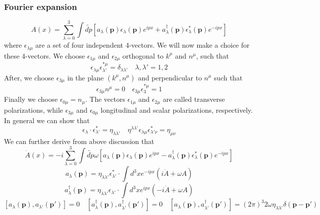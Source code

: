 \documentclass[cyan]{elegantnote}
\begin{document}
\subsubsection{Fourier expansion}
\[A(x) = \sum_{\lambda=0}^{3} \int \widetilde{dp} [a_{\lambda}(\bm{p}) \epsilon_{\lambda}(\bm{p})e^{ipx} + a^{\dagger}_{\lambda}(\bm{p}) \epsilon^*_{\lambda}(\bm{p})e^{-ipx}]\]
where $\epsilon_{\lambda \mu}$ are a set of four independent 4-vectors.  We will now make a choice for these 4-vectors. We choose $\epsilon_{1\mu}$ and $\epsilon_{2\mu}$ orthogonal to $k^{\mu}$ and $n^{\mu}$, such that
\[\epsilon_{\lambda \mu} \epsilon^{*\mu}_{\lambda'} = \delta_{\lambda \lambda'} \quad \lambda,\lambda' = 1,2\]
After, we choose $\epsilon_{3\mu}$ in the plane $(k^{\mu},n^{\mu})$ and perpendicular to $n^{\mu}$ such that
\[\epsilon_{3\mu} n^{\mu} = 0 \quad \epsilon_{3\mu} \epsilon^{*\mu}_{3} = 1\]
Finally we choose $\epsilon_{0\mu} = n_{\mu}$. The vectors $\epsilon_{1\mu}$ and $\epsilon_{2\mu}$ are called transverse polarizations, while $\epsilon_{3\mu}$ and $\epsilon_{0\mu}$ longitudinal and scalar polarizations, respectively.\\
In general we can show that
\[\epsilon_{\lambda} \cdot \epsilon^*_{\lambda'} = \eta_{\lambda \lambda'} \quad \eta^{\lambda \lambda'} \epsilon_{\lambda \mu} \epsilon^*_{\lambda' \nu} = \eta_{\mu \nu} \]
We can further derive from above discussion that
\[\dot{A}(x) = -i \sum_{\lambda=0}^{3} \int \widetilde{dp} \omega [a_{\lambda}(\bm{p}) \epsilon_{\lambda}(\bm{p})e^{ipx} - a^{\dagger}_{\lambda}(\bm{p}) \epsilon^*_{\lambda}(\bm{p})e^{-ipx}]\]
\[ a_{\lambda}(\bm{p}) =  \eta_{\lambda \lambda'} \epsilon^*_{\lambda'} \cdot \int d^3x e^{-ipx}(i\dot{A}+\omega A)\]
\[ a^{\dagger}_{\lambda}(\bm{p}) =  \eta_{\lambda \lambda'} \epsilon_{\lambda'} \cdot \int d^3x e^{ipx}(-i\dot{A}+\omega A)\]
\[[a_{\lambda}(\bm{p}),a_{\lambda'}(\bm{p'})] = 0 \quad [a^{\dagger}_{\lambda}(\bm{p}),a^{\dagger}_{\lambda'}(\bm{p'})] = 0 \quad [a_{\lambda}(\bm{p}),a^{\dagger}_{\lambda'}(\bm{p'})] = (2\pi)^3 2\omega \eta_{\lambda \lambda'} \delta(\bm{p} - \bm{p}')\]
\end{document}
